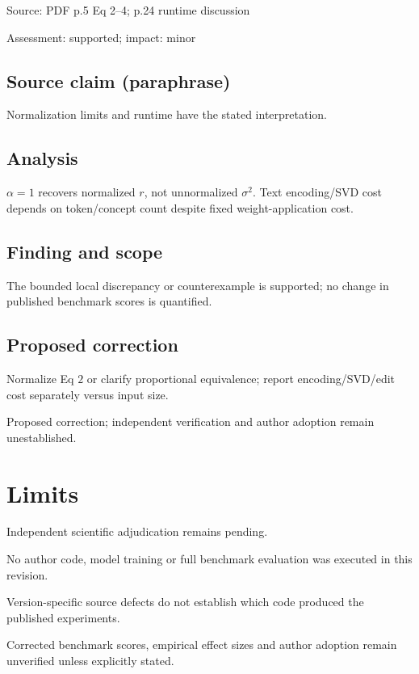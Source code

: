 \documentclass[11pt]{article}
\begin{document}
Source: PDF p.5 Eq 2–4; p.24 runtime discussion

Assessment: supported; impact: minor

\subsection*{Source claim (paraphrase)}

Normalization limits and runtime have the stated interpretation.

\subsection*{Analysis}

\(\alpha=1\) recovers normalized \(r\), not unnormalized \(\sigma^2\). Text encoding/SVD cost depends on token/concept count despite fixed weight-application cost.

\subsection*{Finding and scope}

The bounded local discrepancy or counterexample is supported; no change in published benchmark scores is quantified.

\subsection*{Proposed correction}

Normalize Eq \(2\) or clarify proportional equivalence; report encoding/SVD/edit cost separately versus input size.

Proposed correction; independent verification and author adoption remain unestablished.

\section*{Limits}

Independent scientific adjudication remains pending.\par

No author code, model training or full benchmark evaluation was executed in this revision.\par

Version-specific source defects do not establish which code produced the published experiments.\par

Corrected benchmark scores, empirical effect sizes and author adoption remain unverified unless explicitly stated.\par
\end{document}
